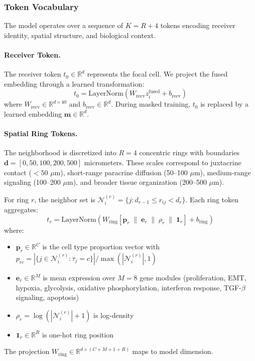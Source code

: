 \subsubsection{Token Vocabulary}

The model operates over a sequence of $K = R + 4$ tokens encoding receiver identity, spatial structure, and biological context.

\paragraph{Receiver Token.} The receiver token $t_0 \in \mathbb{R}^d$ represents the focal cell. We project the fused embedding through a learned transformation:
\begin{equation}
    t_0 = \text{LayerNorm}(W_{\text{recv}} z_i^{\text{fused}} + b_{\text{recv}})
\end{equation}
where $W_{\text{recv}} \in \mathbb{R}^{d \times 40}$ and $b_{\text{recv}} \in \mathbb{R}^d$. During masked training, $t_0$ is replaced by a learned embedding $\mathbf{m} \in \mathbb{R}^d$.

\paragraph{Spatial Ring Tokens.} The neighborhood is discretized into $R = 4$ concentric rings with boundaries $\mathbf{d} = [0, 50, 100, 200, 500]$ micrometers. These scales correspond to juxtacrine contact ($<50$ $\mu$m), short-range paracrine diffusion (50–100 $\mu$m), medium-range signaling (100–200 $\mu$m), and broader tissue organization (200–500 $\mu$m).

For ring $r$, the neighbor set is $\mathcal{N}_i^{(r)} = \{j : d_{r-1} \leq r_{ij} < d_r\}$. Each ring token aggregates:
\begin{equation}
    t_r = \text{LayerNorm}\left(W_{\text{ring}} \left[ \mathbf{p}_r \;\|\; \mathbf{e}_r \;\|\; \rho_r \;\|\; \mathbf{1}_r \right] + b_{\text{ring}}\right)
\end{equation}
where:
\begin{itemize}
    \item $\mathbf{p}_r \in \mathbb{R}^C$ is the cell type proportion vector with $p_{rc} = |\{j \in \mathcal{N}_i^{(r)} : \tau_j = c\}| / \max(|\mathcal{N}_i^{(r)}|, 1)$
    \item $\mathbf{e}_r \in \mathbb{R}^M$ is mean expression over $M = 8$ gene modules (proliferation, EMT, hypoxia, glycolysis, oxidative phosphorylation, interferon response, TGF-$\beta$ signaling, apoptosis)
    \item $\rho_r = \log(|\mathcal{N}_i^{(r)}| + 1)$ is log-density
    \item $\mathbf{1}_r \in \mathbb{R}^R$ is one-hot ring position
\end{itemize}
The projection $W_{\text{ring}} \in \mathbb{R}^{d \times (C + M + 1 + R)}$ maps to model dimension.

